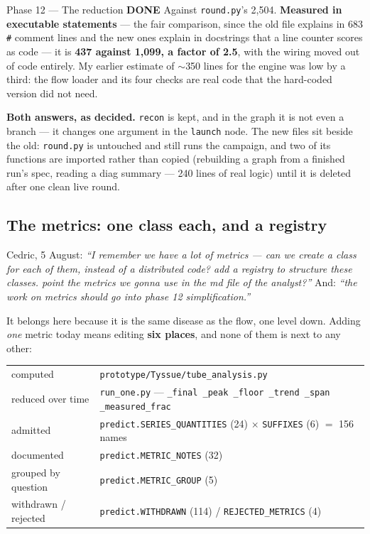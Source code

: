 \documentclass[11pt,a4paper]{article}
\newcommand{\code}[1]{\texttt{#1}}
\newcommand{\done}{\textcolor{good}{\textbf{DONE}}}
\begin{document}
\begin{phasebox}{Phase 12 --- The reduction \hfill \done}
\noindent Against \code{round.py}'s 2,504. \textbf{Measured in executable statements} --- the fair
comparison, since the old file explains in 683 \code{\#} comment lines and the new ones explain in
docstrings that a line counter scores as code --- it is \textbf{437 against 1,099, a factor of 2.5},
with the wiring moved out of code entirely. My earlier estimate of $\sim$350 lines for the engine was
low by a third: the flow loader and its four checks are real code that the hard-coded version did not
need.

\textbf{Both answers, as decided.} \code{recon} is kept, and in the graph it is not even a branch ---
it changes one argument in the \code{launch} node. The new files sit beside the old: \code{round.py}
is untouched and still runs the campaign, and two of its functions are imported rather than copied
(rebuilding a graph from a finished run's spec, reading a diag summary --- 240 lines of real logic)
until it is deleted after one clean live round.

\subsection*{The metrics: one class each, and a registry}
Cedric, 5 August: \emph{``I remember we have a lot of metrics --- can we create a class for each of
them, instead of a distributed code? add a registry to structure these classes. point the metrics
we gonna use in the md file of the analyst?''} And: \emph{``the work on metrics should go into phase
12 simplification.''}

It belongs here because it is the same disease as the flow, one level down. Adding \emph{one} metric
today means editing \textbf{six places}, and none of them is next to any other:

\begin{center}\small
\begin{tabular}{ll}
\toprule
computed              & \code{prototype/Tyssue/tube\_analysis.py} \\
reduced over time     & \code{run\_one.py} --- \code{\_final \_peak \_floor \_trend \_span
                        \_measured\_frac} \\
admitted              & \code{predict.SERIES\_QUANTITIES} (24) $\times$ \code{SUFFIXES} (6) $=$ 156
                        names \\
documented            & \code{predict.METRIC\_NOTES} (32) \\
grouped by question   & \code{predict.METRIC\_GROUP} (5) \\
withdrawn / rejected  & \code{predict.WITHDRAWN} (114) / \code{REJECTED\_METRICS} (4) \\
\bottomrule
\end{tabular}
\end{center}


\end{phasebox}
\end{document}
